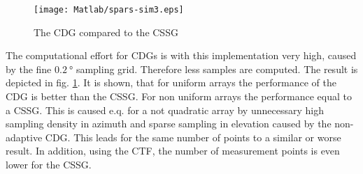 \begin{figure}[h]
\centering
\texttt{[image: Matlab/spars-sim3.eps]}
\caption{The CDG compared to the CSSG}
\label{fig:cdg}
\end{figure}

The computational effort for \acp{CDG} is with this implementation very high, caused by the fine $\SI{0.2}{\degree}$ sampling grid. Therefore less samples are computed. The result is depicted in fig. \ref{fig:cdg}. It is shown, that for uniform arrays the performance of the \ac{CDG} is better than the \ac{CSSG}. For non uniform arrays the performance equal to a \ac{CSSG}. This is caused e.q. for a not quadratic array by unnecessary high sampling density in azimuth and sparse sampling in elevation caused by the non-adaptive \ac{CDG}. This leads for the same number of points to a similar or worse result. In addition, using the \ac{CTF}, the number of measurement points is even lower for the \ac{CSSG}.




